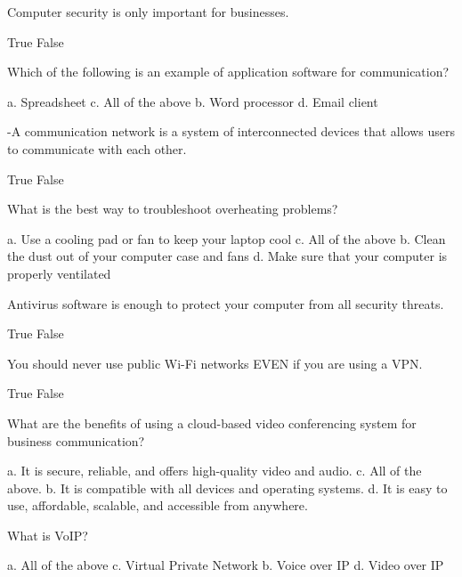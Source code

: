 \documentclass{exam}
\begin{document}
\begin{questions}
\question Computer security is only important for businesses.
\begin{checkboxes}
\choice True
\CorrectChoice False
\end{checkboxes}

\question Which of the following is an example of application software for communication?
\begin{checkboxes}
\choice a. Spreadsheet
\choice c. All of the above
\choice b. Word processor
\CorrectChoice d. Email client
\end{checkboxes}

-A communication network is a system of interconnected devices that allows users to communicate with each other.
\begin{checkboxes}
\CorrectChoice True
\choice False
\end{checkboxes}

\question What is the best way to troubleshoot overheating problems?
\begin{checkboxes}
\choice a. Use a cooling pad or fan to keep your laptop cool
\CorrectChoice c. All of the above
\choice b. Clean the dust out of your computer case and fans
\choice d. Make sure that your computer is properly ventilated
\end{checkboxes}

\question Antivirus software is enough to protect your computer from all security threats.
\begin{checkboxes}
\choice True
\CorrectChoice False
\end{checkboxes}

\question You should never use public Wi-Fi networks EVEN if you are using a VPN.
\begin{checkboxes}
\choice True
\CorrectChoice False
\end{checkboxes}

\question What are the benefits of using a cloud-based video conferencing system for business communication?
\begin{checkboxes}
\choice a. It is secure, reliable, and offers high-quality video and audio.
\CorrectChoice c. All of the above.
\choice b. It is compatible with all devices and operating systems.
\choice d. It is easy to use, affordable, scalable, and accessible from anywhere.
\end{checkboxes}

\question What is VoIP?
\begin{checkboxes}
\choice a. All of the above
\choice c. Virtual Private Network
\CorrectChoice b. Voice over IP
\choice d. Video over IP
\end{checkboxes}


\end{questions}
\end{document}

